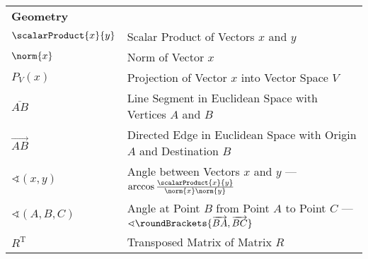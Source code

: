 \documentclass[crop=false,10pt,ngerman]{standalone}
\begin{document}
{\begin{tabularx}{\textwidth}{p{}p{}}

      \textbf{Geometry} & \\
      $\scalarProduct{x}{y}$ & Scalar Product of Vectors $x$ and $y$ \\
      $\norm{x}$ & Norm of Vector $x$ \\
      $P_V(x)$ & Projection of Vector $x$ into Vector Space $V$ \\
      $\overline{AB}$ & Line Segment in Euclidean Space with Vertices $A$ and $B$ \\
      $\overrightarrow{AB}$ & Directed Edge in Euclidean Space with Origin $A$ and Destination $B$ \\
      $\sphericalangle(x,y)$ & Angle between Vectors $x$ and $y$ --- $\arccos\frac{\scalarProduct{x}{y}}{\norm{x}\norm{y}}$ \\
      $\sphericalangle(A,B,C)$ & Angle at Point $B$ from Point $A$ to Point $C$ --- $\sphericalangle\roundBrackets{\overrightarrow{BA}, \overrightarrow{BC}}$ \\
      $R^\mathrm{T}$ & Transposed Matrix of Matrix $R$ \\


\end{tabularx}}
\end{document}
